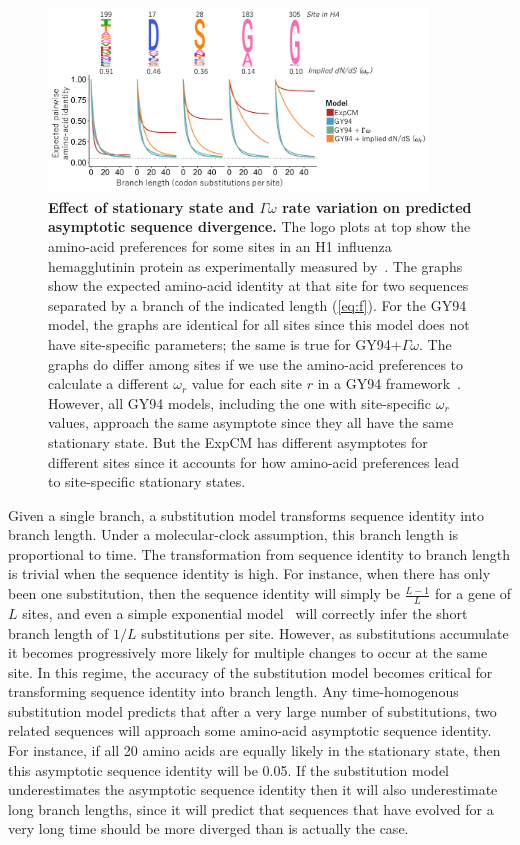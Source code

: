 \documentclass[11pt]{article}
\begin{document}
\begin{figure}
\centerline{\includegraphics[width=0.90\textwidth]{figures/decay.pdf}}
\caption{\label{fig:decay}
\textbf{Effect of stationary state and $\Gamma\omega$ rate variation on predicted asymptotic sequence divergence.}
The logo plots at top show the amino-acid preferences for some sites in an H1 influenza hemagglutinin protein as experimentally measured by~\citet{doud2016accurate}.
The graphs show the expected amino-acid identity at that site for two sequences separated by a branch of the indicated length (\ref{eq:f}).
For the GY94 model, the graphs are identical for all sites since this model does not have site-specific parameters; the same is true for GY94+$\Gamma\omega$.
The graphs do differ among sites if we use the amino-acid preferences to calculate a different $\omega_r$ value for each site $r$ in a GY94 framework~\citep[\ref{eq:w_r};][]{spielman2015relationship}.
However, all GY94 models, including the one with site-specific $\omega_r$ values, approach the same asymptote since they all have the same stationary state.
But the ExpCM has different asymptotes for different sites since it accounts for how amino-acid preferences lead to site-specific stationary states.
}
\end{figure}

Given a single branch, a substitution model transforms sequence identity into branch length.
Under a molecular-clock assumption, this branch length is proportional to time.
The transformation from sequence identity to branch length is trivial when the sequence identity is high.
For instance, when there has only been one substitution, then the sequence identity will simply be $\frac{L - 1}{L}$ for a gene of $L$ sites, and even a simple exponential model~\citep{zuckerkandl1965} will correctly infer the short branch length of $1/L$ substitutions per site.
However, as substitutions accumulate it becomes progressively more likely for multiple changes to occur at the same site.
In this regime, the accuracy of the substitution model becomes critical for transforming sequence identity into branch length.
Any time-homogenous substitution model predicts that after a very large number of substitutions, two related sequences will approach some amino-acid asymptotic sequence identity.
For instance, if all 20 amino acids are equally likely in the stationary state, then this asymptotic sequence identity will be 0.05.
If the substitution model underestimates the asymptotic sequence identity then it will also underestimate long branch lengths, since it will predict that sequences that have evolved for a very long time should be more diverged than is actually the case.
\end{document}
